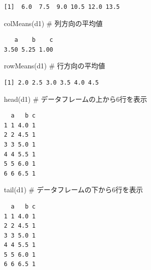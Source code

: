 \documentclass[
  letterpaper,
  DIV=11,
  numbers=noendperiod]{scrreprt}
\newenvironment{Shaded}{\begin{snugshade}}{\end{snugshade}}
\newcommand{\CommentTok}[1]{\textcolor[rgb]{0.37,0.37,0.37}{#1}}
\newcommand{\FunctionTok}[1]{\textcolor[rgb]{0.28,0.35,0.67}{#1}}
\newcommand{\NormalTok}[1]{\textcolor[rgb]{0.00,0.23,0.31}{#1}}
\begin{document}
\begin{verbatim}
[1]  6.0  7.5  9.0 10.5 12.0 13.5
\end{verbatim}

\begin{Shaded}
\begin{Highlighting}[]
\FunctionTok{colMeans}\NormalTok{(d1) }\CommentTok{\# 列方向の平均値}
\end{Highlighting}
\end{Shaded}

\begin{verbatim}
   a    b    c 
3.50 5.25 1.00 
\end{verbatim}

\begin{Shaded}
\begin{Highlighting}[]
\FunctionTok{rowMeans}\NormalTok{(d1) }\CommentTok{\# 行方向の平均値}
\end{Highlighting}
\end{Shaded}

\begin{verbatim}
[1] 2.0 2.5 3.0 3.5 4.0 4.5
\end{verbatim}

\begin{Shaded}
\begin{Highlighting}[]
\FunctionTok{head}\NormalTok{(d1) }\CommentTok{\# データフレームの上から6行を表示}
\end{Highlighting}
\end{Shaded}

\begin{verbatim}
  a   b c
1 1 4.0 1
2 2 4.5 1
3 3 5.0 1
4 4 5.5 1
5 5 6.0 1
6 6 6.5 1
\end{verbatim}

\begin{Shaded}
\begin{Highlighting}[]
\FunctionTok{tail}\NormalTok{(d1) }\CommentTok{\# データフレームの下から6行を表示}
\end{Highlighting}
\end{Shaded}

\begin{verbatim}
  a   b c
1 1 4.0 1
2 2 4.5 1
3 3 5.0 1
4 4 5.5 1
5 5 6.0 1
6 6 6.5 1
\end{verbatim}
\end{document}
